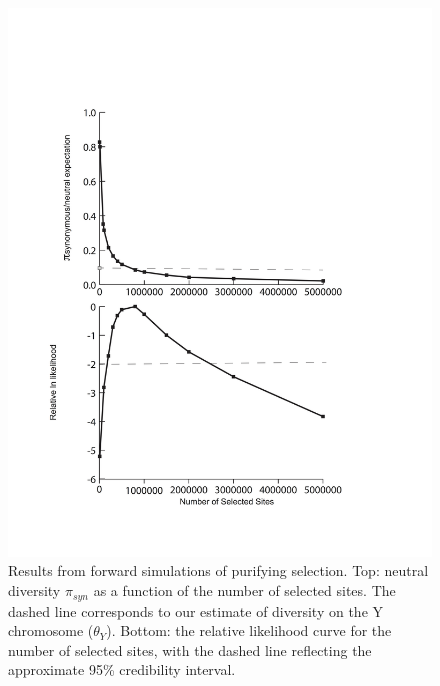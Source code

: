 \documentclass[9pt,twocolumn,twoside]{gsajnl}
\begin{document}
\begin{figure}[t!]
\centering
\noindent
\includegraphics[width=\linewidth]{figure3.jpg}
\caption{Results from forward simulations of purifying selection. Top: neutral diversity $\pi_{syn}$ as a function of the number of selected sites. The dashed line corresponds to our estimate of diversity on the Y chromosome ($\theta_{Y}$). Bottom: the relative likelihood curve for the number of selected sites, with the dashed line reflecting the approximate 95\% credibility interval.
}
\label{fig:selectedsites}
\end{figure}
\end{document}
